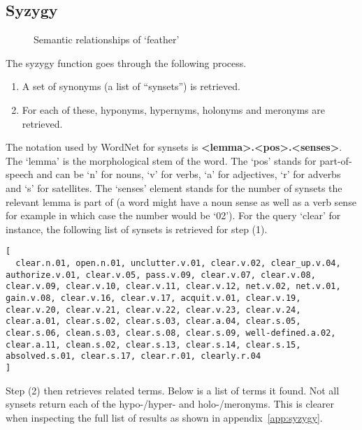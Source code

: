 \subsection{Syzygy}

\begin{figure}[!htbp]
\centering
  
  \caption[Semantic relationships of `feather']{Semantic relationships of `feather'}
\label{fig:wordnet}
\end{figure}

The syzygy function goes through the following process.

\begin{enumerate}
  \item A set of synonyms (a list of ``synsets'') is retrieved.
  \item For each of these, hyponyms, hypernyms, holonyms and meronyms are retrieved.
\end{enumerate}

The notation used by WordNet for synsets is \textbf{<lemma>.<pos>.<senses>}. The `lemma' is the morphological stem of the word. The `pos' stands for part-of-speech and can be `n' for nouns, `v' for verbs, `a'
for adjectives, `r' for adverbs and `s' for satellites. The `senses' element stands for the number of synsets the relevant lemma is part of (a word might have a noun sense as well as a verb sense for example in which case the number would be `02'). For the query `clear' for instance, the following list of synsets is retrieved for step (1).

\begin{verbatim}
[
  clear.n.01, open.n.01, unclutter.v.01, clear.v.02, clear_up.v.04, authorize.v.01, clear.v.05, pass.v.09, clear.v.07, clear.v.08, clear.v.09, clear.v.10, clear.v.11, clear.v.12, net.v.02, net.v.01, gain.v.08, clear.v.16, clear.v.17, acquit.v.01, clear.v.19, clear.v.20, clear.v.21, clear.v.22, clear.v.23, clear.v.24, clear.a.01, clear.s.02, clear.s.03, clear.a.04, clear.s.05, clear.s.06, clean.s.03, clear.s.08, clear.s.09, well-defined.a.02, clear.a.11, clean.s.02, clear.s.13, clear.s.14, clear.s.15, absolved.s.01, clear.s.17, clear.r.01, clearly.r.04
]
\end{verbatim}

Step (2) then retrieves related terms. Below is a list of terms it found. Not all synsets return each of the hypo-/hyper- and holo-/meronyms. This is clearer when inspecting the full list of results as shown in appendix~\ref{app:syzygy}. 

